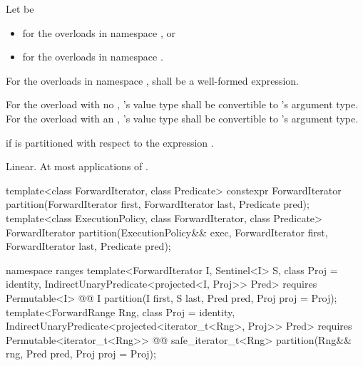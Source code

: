 \begin{itemdescr}
\begin{newnewblock}
\pnum
Let  be
\begin{itemize}
\item {} for the overloads in namespace , or
\item {} for the overloads in
  namespace .
\end{itemize}

\pnum
\requires
For the overloads in namespace ,
 shall be a well-formed expression.
\end{newnewblock}

\begin{oldoldblock}
\pnum
\requires For the overload with no ,
's value type shall be convertible to 's
argument type.  For the overload with an ,
's value type shall be convertible to 's
argument type.
\end{oldoldblock}

\pnum
\returns {} if 
 is  partitioned with respect to the expression
 .

\pnum
\complexity Linear. At most  applications of 
.
\end{itemdescr}


%
\begin{itemdecl}
template<class ForwardIterator, class Predicate>
  constexpr ForwardIterator
    partition(ForwardIterator first, ForwardIterator last, Predicate pred);
template<class ExecutionPolicy, class ForwardIterator, class Predicate>
  ForwardIterator
    partition(ExecutionPolicy&& exec,
              ForwardIterator first, ForwardIterator last, Predicate pred);
\end{itemdecl}
\begin{addedblock}
\begin{itemdecl}
namespace ranges {
  template<ForwardIterator I, Sentinel<I> S, class Proj = identity,
      IndirectUnaryPredicate<projected<I, Proj>> Pred>
    requires Permutable<I>
    @@ I
      partition(I first, S last, Pred pred, Proj proj = Proj{});
  template<ForwardRange Rng, class Proj = identity,
      IndirectUnaryPredicate<projected<iterator_t<Rng>, Proj>> Pred>
    requires Permutable<iterator_t<Rng>>
    @@ safe_iterator_t<Rng>
      partition(Rng&& rng, Pred pred, Proj proj = Proj{});
}
\end{itemdecl}
\end{addedblock}

